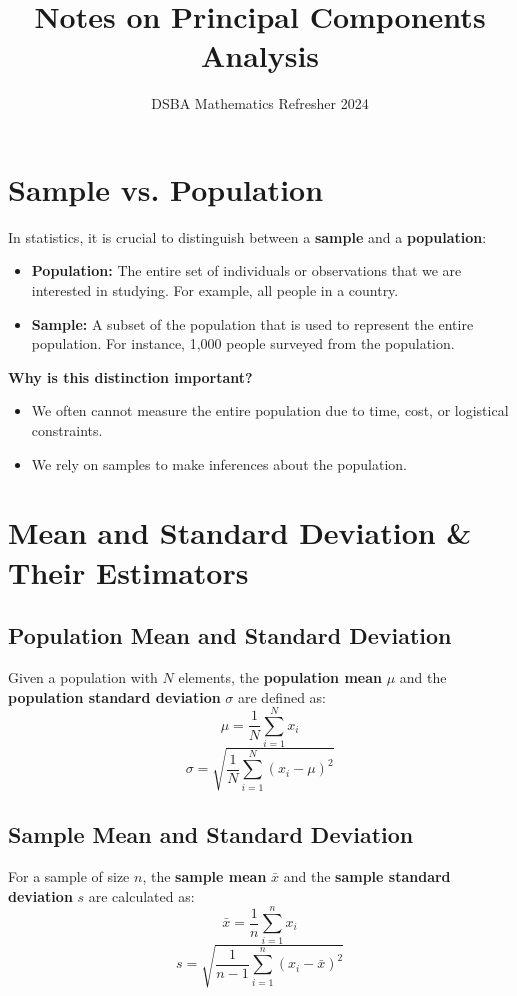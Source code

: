 \documentclass[]{article}
\title{Notes on Principal Components Analysis}
\author{DSBA Mathematics Refresher 2024}
\date{}
\begin{document}
	
	\maketitle
	
	\begin{abstract}
		
	\end{abstract}
	
	\section{Sample vs. Population}
	In statistics, it is crucial to distinguish between a \textbf{sample} and a \textbf{population}:
	\begin{itemize}
		\item \textbf{Population:} The entire set of individuals or observations that we are interested in studying. For example, all people in a country.
		\item \textbf{Sample:} A subset of the population that is used to represent the entire population. For instance, 1,000 people surveyed from the population.
	\end{itemize}
	
	\textbf{Why is this distinction important?}
	\begin{itemize}
		\item We often cannot measure the entire population due to time, cost, or logistical constraints.
		\item We rely on samples to make inferences about the population.
	\end{itemize}
	
	\section{Mean and Standard Deviation \& Their Estimators}
	\subsection{Population Mean and Standard Deviation}
	Given a population with $N$ elements, the \textbf{population mean} $\mu$ and the \textbf{population standard deviation} $\sigma$ are defined as:
	\[
	\mu = \frac{1}{N} \sum_{i=1}^N x_i
	\]
	\[
	\sigma = \sqrt{\frac{1}{N} \sum_{i=1}^N (x_i - \mu)^2}
	\]
	
	\subsection{Sample Mean and Standard Deviation}
	For a sample of size $n$, the \textbf{sample mean} $\bar{x}$ and the \textbf{sample standard deviation} $s$ are calculated as:
	\[
	\bar{x} = \frac{1}{n} \sum_{i=1}^n x_i
	\]
	\[
	s = \sqrt{\frac{1}{n-1} \sum_{i=1}^n (x_i - \bar{x})^2}
	\]
	
\end{document}
